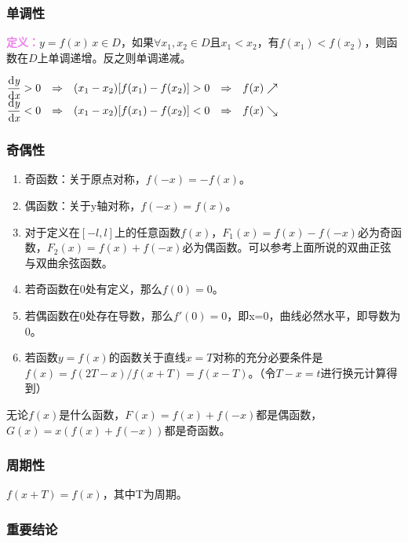 \documentclass[UTF8, 12pt]{ctexart}
\begin{document}
\subsubsection{单调性}

\textcolor{violet}{\textbf{定义：}}$y=f(x)\,x\in D$，如果$\forall x_1,x_2\in D$且$x_1<x_2$，有$f(x_1)<f(x_2)$，则函数在$D$上单调递增。反之则单调递减。

\medskip

$\begin{matrix}
        \dfrac{\rm{d}\textit{y}}{\rm{d}\textit{x}}>0 & \Rightarrow & (x_1-x_2)[f(x_1)-f(x_2)]>0 & \Rightarrow & f(x)\nearrow \\
        \dfrac{\rm{d}\textit{y}}{\rm{d}\textit{x}}<0 & \Rightarrow & (x_1-x_2)[f(x_1)-f(x_2)]<0 & \Rightarrow & f(x)\searrow
    \end{matrix}
$

\subsubsection{奇偶性}

\begin{enumerate}
    \item 奇函数：关于原点对称，$f(-x)=-f(x)$。
    \item 偶函数：关于y轴对称，$f(-x)=f(x)$。
    \item 对于定义在$[-l,l]$上的任意函数$f(x)$，$F_1(x)=f(x)-f(-x)$必为奇函数，$F_2(x)=f(x)+f(-x)$必为偶函数。可以参考上面所说的双曲正弦与双曲余弦函数。
    \item 若奇函数在0处有定义，那么$f(0)=0$。
    \item 若偶函数在0处存在导数，那么$f'(0)=0$，即x=0，曲线必然水平，即导数为0。
    \item 若函数$y=f(x)$的函数关于直线$x=T$对称的充分必要条件是$f(x)=f(2T-x)/f(x+T)=f(x-T)$。（令$T-x=t$进行换元计算得到）
\end{enumerate}

无论$f(x)$是什么函数，$F(x)=f(x)+f(-x)$都是偶函数，$G(x)=x(f(x)+f(-x))$都是奇函数。

\subsubsection{周期性}

$f(x+T)=f(x)$，其中T为周期。 \medskip

\subsubsection{重要结论}
\end{document}
